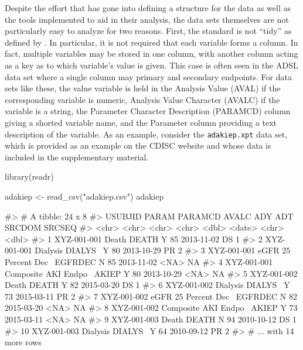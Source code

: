 Despite the effort that has gone into defining a structure for the data
as well as the tools implemented to aid in their analysis, the data sets
themselves are not particularly easy to analyze for two reasons. First,
the standard is not ``tidy'' as defined by \citet{wickham2014}. In
particular, it is not required that each variable forms a column. In
fact, multiple variables may be stored in one column, with another
column acting as a key as to which variable's value is given. This case
is often seen in the ADSL data set where a single column may primary and
secondary endpoints. For data sets like these, the value variable is
held in the Analysis Value (AVAL) if the corresponding variable is
numeric, Analysis Value Character (AVALC) if the variable is a string,
the Parameter Character Description (PARAMCD) column giving a shorted
variable name, and the Parameter column providing a text description of
the variable. As an example, consider the \texttt{adakiep.xpt} data set,
which is provided as an example on the CDISC website and whose data is
included in the supplementary material.

\begin{Schunk}
\begin{Sinput}
library(readr)

adakiep <- read_csv("adakiep.csv") 
adakiep
\end{Sinput}
\begin{Soutput}
#> # A tibble: 24 x 8
#>    USUBJID     PARAM                PARAMCD AVALC   ADY ADT        SRCDOM SRCSEQ
#>    <chr>       <chr>                <chr>   <chr> <dbl> <date>     <chr>   <dbl>
#>  1 XYZ-001-001 Death                DEATH   Y        85 2013-11-02 DS          1
#>  2 XYZ-001-001 Dialysis             DIALYS~ Y        80 2013-10-29 PR          2
#>  3 XYZ-001-001 eGFR 25 Percent Dec~ EGFRDEC N        85 2013-11-02 <NA>       NA
#>  4 XYZ-001-001 Composite AKI Endpo~ AKIEP   Y        80 2013-10-29 <NA>       NA
#>  5 XYZ-001-002 Death                DEATH   Y        82 2015-03-20 DS          1
#>  6 XYZ-001-002 Dialysis             DIALYS~ Y        73 2015-03-11 PR          2
#>  7 XYZ-001-002 eGFR 25 Percent Dec~ EGFRDEC N        82 2015-03-20 <NA>       NA
#>  8 XYZ-001-002 Composite AKI Endpo~ AKIEP   Y        73 2015-03-11 <NA>       NA
#>  9 XYZ-001-003 Death                DEATH   N        94 2010-10-12 DS          1
#> 10 XYZ-001-003 Dialysis             DIALYS~ Y        64 2010-09-12 PR          2
#> # ... with 14 more rows
\end{Soutput}
\end{Schunk}


